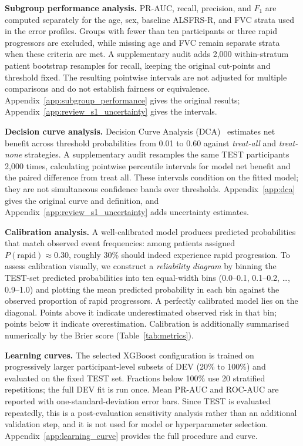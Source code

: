 \noindent\textbf{Subgroup performance analysis.}
\gls{PR-AUC}, recall, precision, and $F_1$ are computed separately for the age, sex, baseline \gls{ALSFRS-R}, and \gls{FVC} strata used in the error profiles. Groups with fewer than ten participants or three rapid progressors are excluded, while missing age and FVC remain separate strata when these criteria are met. A supplementary audit adds 2,000 within-stratum patient bootstrap resamples for recall, keeping the original cut-points and threshold fixed. The resulting pointwise intervals are not adjusted for multiple comparisons and do not establish fairness or equivalence. Appendix~\ref{app:subgroup_performance} gives the original results; Appendix~\ref{app:review_s1_uncertainty} gives the intervals.

\noindent\textbf{Decision curve analysis.}
Decision Curve Analysis (\gls{DCA})~\cite{vickers2006dca} estimates net benefit across threshold probabilities from 0.01 to 0.60 against \textit{treat-all} and \textit{treat-none} strategies. A supplementary audit resamples the same TEST participants 2,000 times, calculating pointwise percentile intervals for model net benefit and the paired difference from treat all. These intervals condition on the fitted model; they are not simultaneous confidence bands over thresholds. Appendix~\ref{app:dca} gives the original curve and definition, and Appendix~\ref{app:review_s1_uncertainty} adds uncertainty estimates.

\noindent\textbf{Calibration analysis.}
A well-calibrated model produces predicted probabilities that match observed event frequencies: among patients assigned $P(\text{rapid}) \approx 0.30$, roughly 30\% should indeed experience rapid progression.
To assess calibration visually, we construct a \textit{reliability diagram} by binning the \gls{TEST}-set predicted probabilities into ten equal-width bins (0.0--0.1, 0.1--0.2, \ldots, 0.9--1.0) and plotting the mean predicted probability in each bin against the observed proportion of rapid progressors.
A perfectly calibrated model lies on the diagonal. Points above it indicate underestimated observed risk in that bin; points below it indicate overestimation.
Calibration is additionally summarised numerically by the Brier score (Table~\ref{tab:metrics}).

\noindent\textbf{Learning curves.}
The selected XGBoost configuration is trained on progressively larger participant-level subsets of \gls{DEV} (20\% to 100\%) and evaluated on the fixed \gls{TEST} set. Fractions below 100\% use 20 stratified repetitions; the full DEV fit is run once. Mean \gls{PR-AUC} and \gls{ROC-AUC} are reported with one-standard-deviation error bars. Since TEST is evaluated repeatedly, this is a post-evaluation sensitivity analysis rather than an additional validation step, and it is not used for model or hyperparameter selection. Appendix~\ref{app:learning_curve} provides the full procedure and curve.

